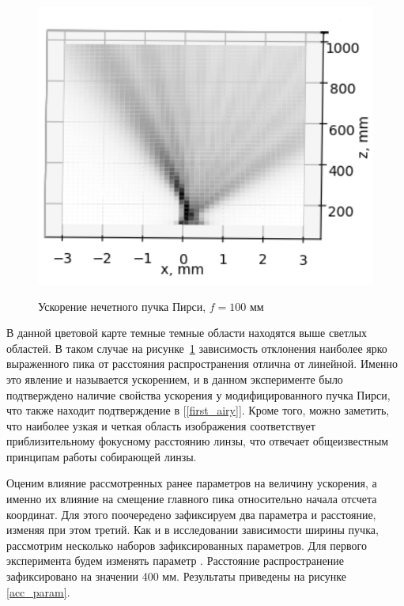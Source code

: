 {    \begin{figure}[H]
        \centering
        \includegraphics[height = 10cm]{plots/pe_acc_before_focus.png}
        \caption{Ускорение нечетного пучка Пирси, $f = 100$ мм}
        \label{correct_acc_peodd}
    \end{figure}
    \vspace{0.4cm}
    В данной цветовой карте темные темные области находятся выше светлых областей.
    В таком случае на рисунке~\ref{correct_acc_peodd} зависимость отклонения наиболее ярко
    выраженного пика от расстояния распространения отлична от линейной.
    Именно это явление и называется ускорением, и в данном эксперименте было подтверждено наличие свойства ускорения
    у модифицированного пучка Пирси, что также находит подтверждение в [\ref{first_airy}].
    Кроме того, можно заметить, что наиболее узкая и четкая область изображения соответствует приблизительному
    фокусному расстоянию линзы, что отвечает общеизвестным принципам работы собирающей линзы.

    Оценим влияние рассмотренных ранее параметров на величину ускорения, а именно их влияние на смещение главного пика относительно начала отсчета координат.
    Для этого поочередено зафиксируем два параметра и расстояние, изменяя
    при этом третий. Как и в исследовании зависимости ширины пучка, рассмотрим несколько наборов зафиксированных параметров. Для первого эксперимента будем изменять параметр \alpha.
    Расстояние распространение зафиксировано на значении 400 мм. Результаты приведены на рисунке \ref{acc_param}.

}
